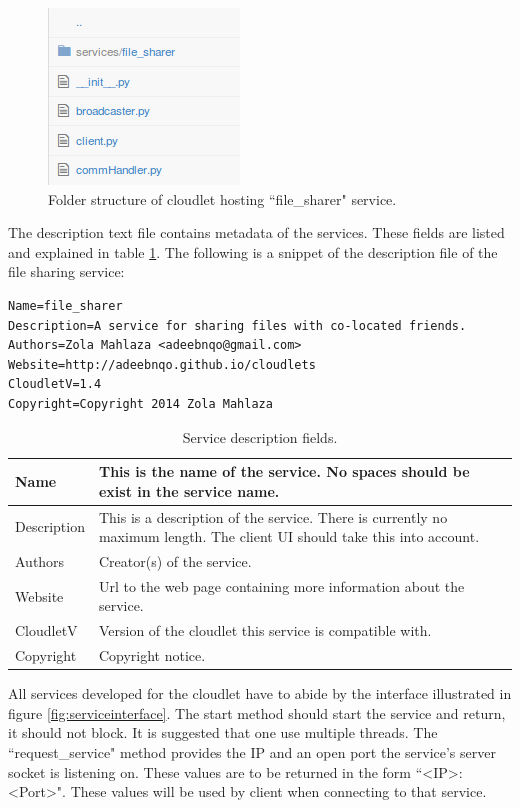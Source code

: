 \begin{figure}[!h]
\centering
\includegraphics{figures/fstrucure}
\caption{Folder structure of cloudlet hosting ``file\_sharer" service.}
\label{fig:folderstructure}
\end{figure}

The description text file contains metadata of the services. These fields are listed and explained in table \ref{table:servicedescription}. The following is a snippet of the description file of the file sharing service:

\begin{lstlisting}[caption=Description of file sharing service]
Name=file_sharer
Description=A service for sharing files with co-located friends.
Authors=Zola Mahlaza <adeebnqo@gmail.com>
Website=http://adeebnqo.github.io/cloudlets
CloudletV=1.4
Copyright=Copyright 2014 Zola Mahlaza
\end{lstlisting}


\begin{table}
\caption{Service description fields.}
\label{table:servicedescription}
\begin{tabular}{ | l | p{8cm} |}
  \hline                       
  Name & This is the name of the service. No spaces should be exist in the service name. \\ \hline
  Description & This is a description of the service. There is currently no maximum length. The client UI should take this into account. \\ \hline
  Authors & Creator(s) of the service. \\ \hline
  Website & Url to the web page containing more information about the service. \\ \hline
  CloudletV & Version of the cloudlet this service is compatible with. \\ \hline
  Copyright & Copyright notice. \\
  \hline  
\end{tabular}
\end{table}

All services developed for the cloudlet have to abide by the interface illustrated in figure \ref{fig:serviceinterface}. The start method should start the service and return, it should not block. It is suggested that one use multiple threads. The ``request\_service" method provides the IP and an open port the service's server socket is listening on. These values are to be returned in the form ``<IP>:<Port>". These values will be used by client when connecting to that service.

